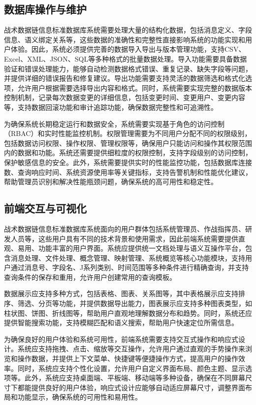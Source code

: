 \subsection{数据库操作与维护}
战术数据链信息标准数据库系统需要处理大量的结构化数据，包括消息定义、字段信息、语义绑定关系等，这些数据的准确性和完整性直接影响系统的功能实现和用户体验。因此，系统必须提供完善的数据导入导出与版本管理功能，支持CSV、Excel、XML、JSON、SQL等多种格式的批量数据处理。导入功能需要具备数据验证和错误处理能力，能够自动检测数据格式错误、重复记录、缺失字段等问题，并提供详细的错误报告和修复建议。导出功能需要支持灵活的数据筛选和格式化选项，允许用户根据需要选择导出内容和格式。同时，系统需要实现完整的数据版本控制机制，记录每次数据变更的详细信息，包括变更时间、变更用户、变更内容等，支持数据回滚功能和审计追踪功能，确保数据完整性和可追溯性。

为确保系统长期稳定运行和数据安全，系统需要实现基于角色的访问控制（RBAC）和实时性能监控机制。权限管理需要为不同用户分配不同的权限级别，包括数据访问权限、操作权限、管理权限等，确保用户只能访问和操作其权限范围内的数据和功能。系统还需要提供细粒度的权限控制，支持字段级别的访问控制，保护敏感信息的安全。此外，系统需要提供实时的性能监控功能，包括数据库连接数、查询响应时间、系统资源使用率等关键指标，支持告警机制和性能优化建议，帮助管理员识别和解决性能瓶颈问题，确保系统的高可用性和稳定性\cite{Lekkakos_2008}。

\subsection{前端交互与可视化}
战术数据链信息标准数据库系统面向的用户群体包括系统管理员、作战指挥员、研发人员等，这些用户具有不同的技术背景和使用需求，因此前端系统需要提供直观、易用、功能丰富的用户界面。系统应提供统一文档处理与语义互操作平台，包含消息处理、文件处理、概念管理、映射管理、系统概览等核心功能模块，支持用户通过消息号、字段名、J系列类别、时间范围等多种条件进行精确查询，并支持查询条件的保存和重用，允许用户创建常用的查询模板。

数据展示应支持多种方式，包括表格、图表、关系图等，其中表格展示应支持排序、筛选、分页等功能，并提供数据导出能力，图表展示应支持多种图表类型，如柱状图、饼图、折线图等，帮助用户直观地理解数据分布和趋势。同时，系统还应提供智能搜索功能，支持模糊匹配和语义搜索，帮助用户快速定位所需信息。

为确保良好的用户体验和系统可用性，前端系统需要支持交互式操作和响应式设计。系统应支持拖拽、点击、缩放等交互操作，允许用户通过直观的手势操作来浏览和操作数据，并提供上下文菜单、快捷键等便捷操作方式，提高用户的操作效率。同时，系统应支持个性化设置，允许用户自定义界面布局、颜色主题、显示选项等。此外，系统应支持桌面端、平板端、移动端等多种设备，确保在不同屏幕尺寸下都能提供良好的用户体验，响应式设计应能够自动适应屏幕尺寸，调整界面布局和功能显示，确保系统的可用性和易用性\cite{Ho_2008}。

